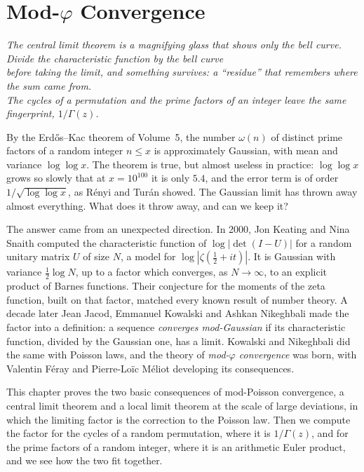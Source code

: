 \chapter{Mod-\texorpdfstring{$\varphi$}{phi} Convergence}
\begin{center}\itshape
The central limit theorem is a magnifying glass that shows only the bell curve. Divide the characteristic function by the bell curve\\
before taking the limit, and something survives: a ``residue'' that remembers where the sum came from.\\
The cycles of a permutation and the prime factors of an integer leave the same fingerprint, $1/\Gamma(z)$.
\end{center}

By the Erd\H{o}s--Kac theorem of Volume~5, the number $\omega(n)$ of distinct prime factors of a random integer $n\le x$ is approximately Gaussian, with mean and variance $\log\log x$. The theorem is true,
but almost useless in practice: $\log\log x$ grows so slowly that at $x=10^{100}$ it is only $5.4$, and the error term is of order $1/\sqrt{\log\log x}$, as R\'enyi and Tur\'an showed. The Gaussian limit has thrown
away almost everything. What does it throw away, and can we keep it?

The answer came from an unexpected direction. In 2000, Jon Keating and Nina Snaith computed the characteristic function of $\log|\det(I-U)|$ for a random unitary matrix $U$ of size $N$, a model for $\log|\zeta(\frac12+it)|$.
It is Gaussian with variance $\frac12\log N$, up to a factor which converges, as $N\to\infty$, to an explicit product of Barnes functions. Their conjecture for the moments of the zeta function, built on that factor, matched every
known result of number theory. A decade later Jean Jacod, Emmanuel Kowalski and Ashkan Nikeghbali made the factor into a definition: a sequence \emph{converges mod-Gaussian} if its characteristic function, divided by the
Gaussian one, has a limit. Kowalski and Nikeghbali did the same with Poisson laws, and the theory of \emph{mod-$\varphi$ convergence} was born, with Valentin F\'eray and Pierre-Lo\"ic M\'eliot developing its consequences.

This chapter proves the two basic consequences of mod-Poisson convergence, a central limit theorem and a local limit theorem at the scale of large deviations, in which the limiting factor is the correction to the
Poisson law. Then we compute the factor for the cycles of a random permutation, where it is $1/\Gamma(z)$, and for the prime factors of a random integer, where it is an arithmetic Euler product, and we see how the two fit together.

